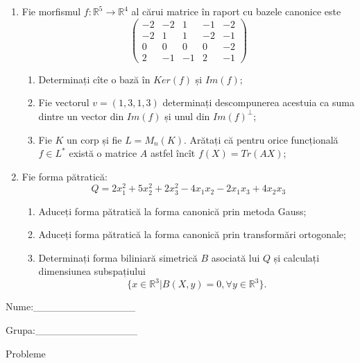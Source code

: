 \documentclass{article}
\begin{document}
\begin{enumerate}
 \item Fie morfismul $f:\mathbb{R}^5 \to \mathbb{R}^4$ al cărui matrice în raport cu bazele canonice este
$$\begin{pmatrix}
-2&-2&1&-1&-2\\
-2&1&1&-2&-1\\
0&0&0&0&-2\\
2&-1&-1&2&-1
\end{pmatrix}$$

\begin{enumerate}
\item Determinați cîte o bază în $Ker(f)$ și $Im(f)$;
\item Fie vectorul $v=(1,3,1,3)$ determinați descompunerea acestuia ca suma dintre un vector din $Im(f)$ și unul din $Im(f)^\perp$;
\item Fie $K$ un corp și fie $L=M_n(K)$. Arătați că pentru orice funcțională $f \in L^*$ există o matrice $A$ astfel încît $f(X)=Tr(AX)$;
\end{enumerate}
\item Fie forma pătratică:
$$Q= 2x_1^2+5x_2^2+2x_3^2-4x_1x_2-2x_1x_3+4x_2x_3$$

\begin{enumerate}
\item Aduceți forma pătratică la forma canonică prin metoda Gauss;
\item Aduceți forma pătratică la forma canonică prin transformări ortogonale;
\item Determinați forma biliniară simetrică $B$ asociată lui $Q$ și calculați dimensiunea subspațiului
$$\{x \in \mathbb{R}^3 | B(X,y)=0,\forall y \in \mathbb{R}^3\}.$$

\end{enumerate}
\end{enumerate}
\newpage
\begin{flushright}
Nume:\_\_\_\_\_\_\_\_\_\_\_\_\_\_
 
 
Grupa:\_\_\_\_\_\_\_\_\_\_\_\_\_\_
\end{flushright}
\begin{center}
\vspace{2cm}
{\Large Probleme}
\vspace{2cm}
\end{center}
\end{document}
